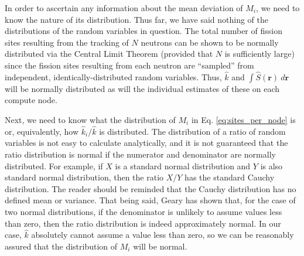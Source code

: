 \documentclass[11pt]{article}
\begin{document}
In order to ascertain any information about the mean deviation of
$M_i$, we need to know the nature of its distribution. Thus far, we
have said nothing of the distributions of the random variables in
question. The total number of fission sites resulting from the
tracking of $N$ neutrons can be shown to be normally distributed via
the Central Limit Theorem (provided that $N$ is sufficiently large)
since the fission sites resulting from each neutron are ``sampled''
from independent, identically-distributed random variables. Thus,
$\hat{k}$ and $\int \hat{S} (\mathbf{r}) \: d\mathbf{r}$ will be
normally distributed as will the individual estimates of these on each
compute node.

Next, we need to know what the distribution of $M_i$ in
Eq. \ref{eq:sites_per_node} is or, equivalently, how $\hat{k}_i /
\hat{k}$ is distributed. The distribution of a ratio of random
variables is not easy to calculate analytically, and it is not
guaranteed that the ratio distribution is normal if the numerator and
denominator are normally distributed. For example, if $X$ is a
standard normal distribution and $Y$ is also standard normal
distribution, then the ratio $X/Y$ has the standard Cauchy
distribution. The reader should be reminded that the Cauchy
distribution has no defined mean or variance. That being said, Geary
\cite{geary} has shown that, for the case of two normal distributions,
if the denominator is unlikely to assume values less than zero, then
the ratio distribution is indeed approximately normal. In our case,
$\hat{k}$ absolutely cannot assume a value less than zero, so we can
be reasonably assured that the distribution of $M_i$ will be normal.
\end{document}
